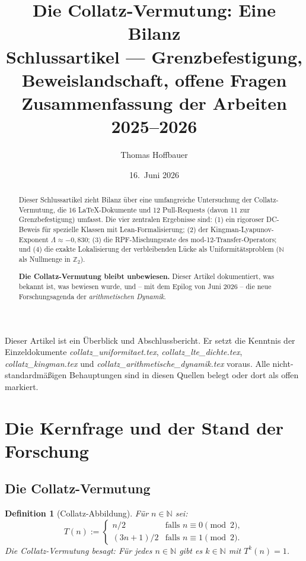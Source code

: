 \documentclass[12pt,a4paper]{article}
\title{%
  Die Collatz-Vermutung: Eine Bilanz\\[0.3em]
  \large Schlussartikel --- Grenzbefestigung, Beweislandschaft,
  offene Fragen\\[0.5em]
  \normalsize Zusammenfassung der Arbeiten 2025--2026%
}
\author{Thomas Hoffbauer}
\date{16.\ Juni 2026}
\newtheorem{definition}{Definition}[section]
\newcommand{\N}{\mathbb{N}}
\newcommand{\Ztwo}{\mathbb{Z}_2}
\begin{document}
\maketitle

\begin{abstract}
Dieser Schlussartikel zieht Bilanz über eine umfangreiche Untersuchung
der Collatz-Vermutung, die 16 LaTeX-Dokumente und 12 Pull-Requests
(davon 11 zur Grenzbefestigung) umfasst. Die vier zentralen Ergebnisse
sind: (1) ein rigoroser DC-Beweis für spezielle Klassen mit Lean-Formalisierung;
(2) der Kingman-Lyapunov-Exponent $\Lambda \approx -0{,}830$;
(3) die RPF-Mischungsrate des mod-12-Transfer-Operators; und
(4) die exakte Lokalisierung der verbleibenden Lücke als
Uniformitätsproblem ($\N$ als Nullmenge in $\Ztwo$).

\textbf{Die Collatz-Vermutung bleibt unbewiesen.} Dieser Artikel
dokumentiert, was bekannt ist, was bewiesen wurde, und -- mit dem
Epilog von Juni 2026 -- die neue Forschungsagenda der
\emph{arithmetischen Dynamik}.
\end{abstract}

\tableofcontents

\bigskip
\begin{tcolorbox}[warnung, title={Zum Status dieses Dokuments}]
Dieser Artikel ist ein Überblick und Abschlussbericht. Er setzt die
Kenntnis der Einzeldokumente
\textit{collatz\_uniformitaet.tex}, \textit{collatz\_lte\_dichte.tex},
\textit{collatz\_kingman.tex} und \textit{collatz\_arithmetische\_dynamik.tex}
voraus. Alle nicht-standardmäßigen Behauptungen sind in diesen Quellen
belegt oder dort als offen markiert.
\end{tcolorbox}

\section{Die Kernfrage und der Stand der Forschung}
\label{sec:kernfrage}

\subsection{Die Collatz-Vermutung}

\begin{definition}[Collatz-Abbildung]
Für $n \in \N$ sei:
\[
  T(n) :=
  \begin{cases}
    n/2 & \text{falls } n \equiv 0 \pmod{2}, \\
    (3n+1)/2 & \text{falls } n \equiv 1 \pmod{2}.
  \end{cases}
\]
Die \emph{Collatz-Vermutung} besagt: Für jedes $n \in \N$ gibt es
$k \in \N$ mit $T^k(n) = 1$.
\end{definition}
\end{document}
